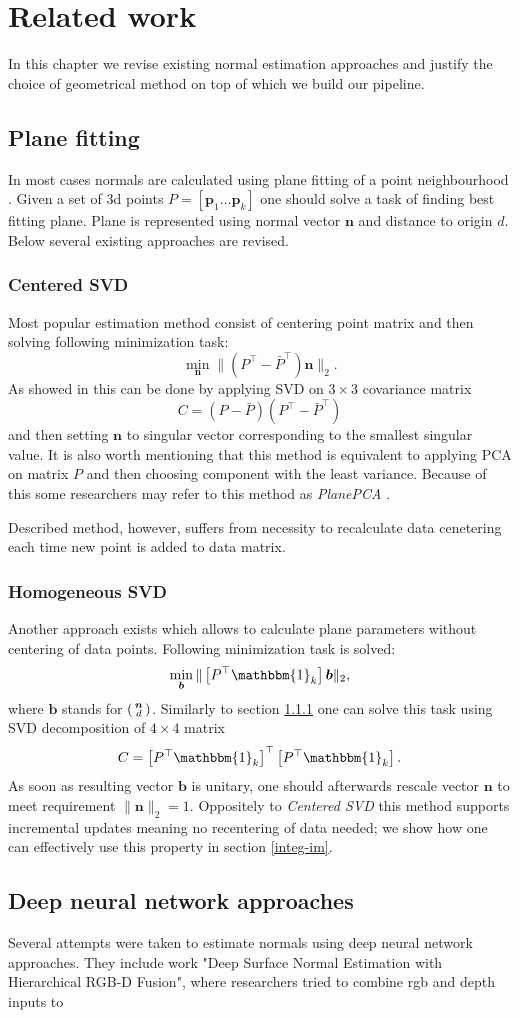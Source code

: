 \chapter{Related work}
In this chapter we revise existing normal estimation approaches and justify the choice of geometrical method on top of which we build our pipeline.

\section{Plane fitting}
In most cases normals are calculated using plane fitting of a point neighbourhood \cite{normal_est}. Given a set of 3d points $P = \left[\bm{p}_1 \dots \bm{p}_k\right]$ one should solve a task of finding best fitting plane. Plane is represented using normal vector $\bm{n}$ and distance to origin $d$. Below several existing approaches are revised.

\subsection{Centered SVD} \label{center-svd}
Most popular estimation method consist of centering point matrix and then solving following minimization task:
\[
\min_{\bm{n}} \| \left(P^\top - \bar{P}^\top \right) \bm{n} \|_2.
\]
As showed in \cite{surface_rec} this can be done by applying SVD on $3 \times 3$ covariance matrix
\[
C = \left(P - \bar{P}\right) \left(P^\top - \bar{P}^\top \right)
\]
and then setting $\bm{n}$ to singular vector corresponding to the smallest singular value. It is also worth mentioning that this method is equivalent to applying PCA on matrix $P$ and then choosing component with the least variance. Because of this some researchers may refer to this method as \textit{PlanePCA} \cite{normal_est}.

Described method, however, suffers from necessity to recalculate data cenetering each time new point is added to data matrix.

\subsection{Homogeneous SVD} \label{homog-svd}
Another approach exists which allows to calculate plane parameters without centering of data points.
Following minimization task is solved:
\[
\min_{\bm{b}} \| \left[P^\top \mathbbm{1}_k \right] \bm{b} \|_2,
\]
where $\bm{b}$ stands for $\begin{psmallmatrix}
\bm{n} \\
d
\end{psmallmatrix}$. Similarly to section \ref{center-svd} one can solve this task using SVD decomposition of $4 \times 4$ matrix
\[
C = \left[P^\top \mathbbm{1}_k \right]^\top \left[P^\top \mathbbm{1}_k \right].
\]
As soon as resulting vector $\bm{b}$ is unitary, one should afterwards rescale vector $\bm{n}$ to meet requirement $\|\bm{n}\|_2 = 1$. Oppositely to \textit{Centered SVD} this method supports incremental updates meaning no recentering of data needed; we show how one can effectively use this property in section \ref{integ-im}.


\section{Deep neural network approaches}

Several attempts were taken to estimate normals using deep neural network approaches. They include work "Deep Surface Normal Estimation with Hierarchical RGB-D Fusion", where researchers tried to combine rgb and depth inputs to 